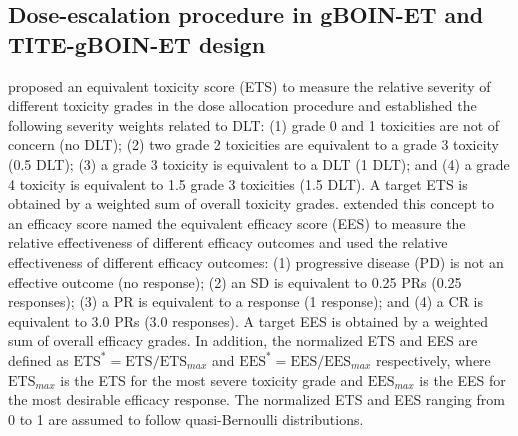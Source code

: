 \subsection{Dose-escalation procedure in gBOIN-ET and TITE-gBOIN-ET design}
\citet{yuan:2007} proposed an equivalent toxicity score (ETS) to measure the relative severity of different toxicity grades in the dose allocation procedure and established the following severity weights related to DLT: (1) grade 0 and 1 toxicities are not of concern (no DLT); (2) two grade 2 toxicities are equivalent to a grade 3 toxicity (0.5 DLT); (3) a grade 3 toxicity is equivalent to a DLT (1 DLT); and (4) a grade 4 toxicity is equivalent to 1.5 grade 3 toxicities (1.5 DLT). A target ETS is obtained by a weighted sum of overall toxicity grades. \citet{takeda:2022b} extended this concept to an efficacy score named the equivalent efficacy score (EES) to measure the relative effectiveness of different efficacy outcomes and used the relative effectiveness of different efficacy outcomes: (1) progressive disease (PD) is not an effective outcome (no response); (2) an SD is equivalent to 0.25 PRs (0.25 responses); (3) a PR is equivalent to a response (1 response); and (4) a CR is equivalent to 3.0 PRs (3.0 responses). A target EES is obtained by a weighted sum of overall efficacy grades. In addition, the normalized ETS and EES are defined as $\text{ETS}^{\ast}=\text{ETS}/\text{ETS}_{max}$ and $\text{EES}^{\ast}=\text{EES}/\text{EES}_{max}$ respectively, where $\text{ETS}_{max}$ is the ETS for the most severe toxicity grade and $\text{EES}_{max}$ is the EES for the most desirable efficacy response. The normalized ETS and EES ranging from 0 to 1 are assumed to follow quasi-Bernoulli distributions.

